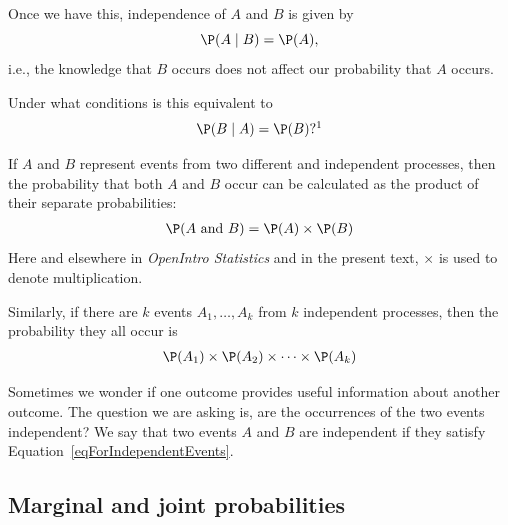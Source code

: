 Once we have this, independence of $A$ and $B$ is given by
\[
	\P(A\mid B) = \P(A),
\]
i.e., the knowledge that $B$ occurs does not affect our probability that $A$ occurs.
\begin{exercise}
	Under what conditions is this equivalent to
	\[
		\P(B\mid A) = \P(B)?\footnote{If $\P(B)=0$ or $\P(A)=0$ then they cannot be equivalent, as they will not both be defined. However, once both probabilities are nonzero, both equations are just expressing that $\P(A\cap B)=\P(A)\P(B)$.}
	\]
\end{exercise}

\begin{termBox}{
If $A$ and $B$ represent events from two different and independent processes, then the probability that both $A$ and $B$ occur can be calculated as the product of their separate probabilities: \vspace{-1.5mm}
\begin{eqnarray}\label{eqForIndependentEvents}
\P(A \text{ and }B) = \P(A) \times  \P(B)
\end{eqnarray}
Here and elsewhere in \emph{OpenIntro Statistics} and in the present text, $\times$ is used to denote multiplication.

Similarly, if there are $k$ events $A_1,\dots,A_k$ from $k$ independent processes, then the probability they all occur is\vspace{-1.5mm}
\begin{eqnarray*}
\P(A_1) \times  \P(A_2)\times  \cdots \times  \P(A_k)
\end{eqnarray*}\vspace{-6mm}}
\end{termBox}


Sometimes we wonder if one outcome provides useful information about another outcome. The question we are asking is, are the occurrences of the two events independent? We say that two events $A$ and $B$ are independent if they satisfy Equation~\eqref{eqForIndependentEvents}.



\subsection{Marginal and joint probabilities}
\label{marginalAndJointProbabilities}


